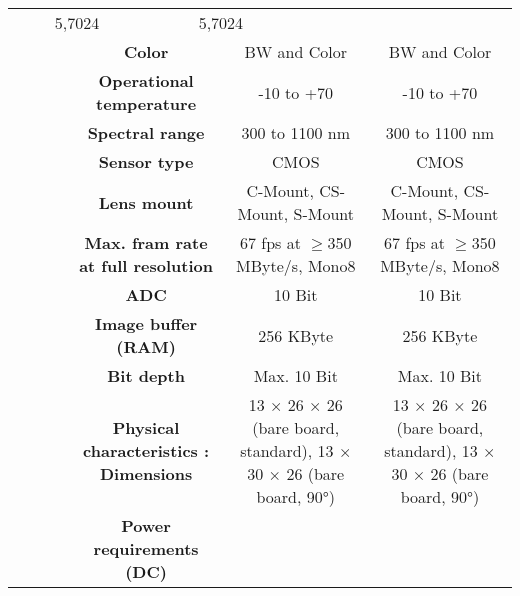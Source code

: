 \begin{table}[H]
{\begin{tabular}{ccc|cc|cc|}
  \multicolumn{2}{c|}{5,7024} &
  \multicolumn{2}{c|}{5,7024} \\
\multicolumn{1}{|c|}{} &
  \multicolumn{2}{c|}{\cellcolor[HTML]{EFEFEF}\textbf{Color}} &
  \multicolumn{2}{c|}{\cellcolor[HTML]{EFEFEF}BW and Color} &
  \multicolumn{2}{c|}{\cellcolor[HTML]{EFEFEF}BW and Color} \\
\multicolumn{1}{|c|}{} &
  \multicolumn{2}{c|}{\textbf{Operational temperature}} &
  \multicolumn{2}{c|}{-10 to +70} &
  \multicolumn{2}{c|}{-10 to +70} \\
\multicolumn{1}{|c|}{} &
  \multicolumn{2}{c|}{\cellcolor[HTML]{EFEFEF}\textbf{Spectral range}} &
  \multicolumn{2}{c|}{\cellcolor[HTML]{EFEFEF}300 to 1100 nm} &
  \multicolumn{2}{c|}{\cellcolor[HTML]{EFEFEF}300 to 1100 nm} \\
\multicolumn{1}{|c|}{} &
  \multicolumn{2}{c|}{\textbf{Sensor type}} &
  \multicolumn{2}{c|}{CMOS} &
  \multicolumn{2}{c|}{CMOS} \\
\multicolumn{1}{|c|}{} &
  \multicolumn{2}{c|}{\cellcolor[HTML]{EFEFEF}\textbf{Lens mount}} &
  \multicolumn{2}{c|}{\cellcolor[HTML]{EFEFEF}C-Mount, CS-Mount, S-Mount} &
  \multicolumn{2}{c|}{\cellcolor[HTML]{EFEFEF}C-Mount, CS-Mount, S-Mount} \\
\multicolumn{1}{|c|}{} &
  \multicolumn{2}{c|}{\textbf{Max. fram rate at full resolution}} &
  \multicolumn{2}{c|}{67 fps at $\geq$350 MByte/s, Mono8} &
  \multicolumn{2}{c|}{67 fps at $\geq$350 MByte/s, Mono8} \\
\multicolumn{1}{|c|}{} &
  \multicolumn{2}{c|}{\cellcolor[HTML]{EFEFEF}\textbf{ADC}} &
  \multicolumn{2}{c|}{\cellcolor[HTML]{EFEFEF}10 Bit} &
  \multicolumn{2}{c|}{\cellcolor[HTML]{EFEFEF}10 Bit} \\
\multicolumn{1}{|c|}{} &
  \multicolumn{2}{c|}{\textbf{Image buffer (RAM)}} &
  \multicolumn{2}{c|}{256 KByte} &
  \multicolumn{2}{c|}{256 KByte} \\
\multicolumn{1}{|c|}{} &
  \multicolumn{2}{c|}{\cellcolor[HTML]{EFEFEF}\textbf{Bit depth}} &
  \multicolumn{2}{c|}{\cellcolor[HTML]{EFEFEF}Max. 10 Bit} &
  \multicolumn{2}{c|}{\cellcolor[HTML]{EFEFEF}Max. 10 Bit} \\
\multicolumn{1}{|c|}{} &
  \multicolumn{2}{c|}{\textbf{Physical characteristics : Dimensions}} &
  \multicolumn{2}{c|}{13 × 26 × 26 (bare board, standard), 13 × 30 × 26 (bare board, 90°)} &
  \multicolumn{2}{c|}{13 × 26 × 26 (bare board, standard), 13 × 30 × 26 (bare board, 90°)} \\
\multicolumn{1}{|c|}{} &
  \multicolumn{2}{c|}{\cellcolor[HTML]{EFEFEF}\textbf{Power requirements (DC)}} &

\end{tabular}}
\end{table}
